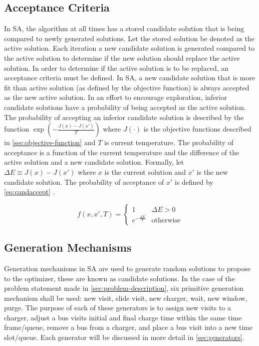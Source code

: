 \documentclass[11pt,a4paper,final]{article}
\newcommand{\Tau}{T}                        %
\begin{document}
\subsection{Acceptance Criteria}
\label{sec:acceptance}
In SA, the algorithm at all times has a stored candidate solution that is being compared to newly generated solutions.
Let the stored solution be denoted as the active solution. Each iteration a new candidate solution is generated compared
to the active solution to determine if the new solution should replace the active solution. In order to determine if the
active solution is to be replaced, an acceptance criteria must be defined. In SA, a new candidate solution that is more
fit than active solution (as defined by the objective function) is always accepted as the new active solution. In an
effort to encourage exploration, inferior candidate solutions have a probability of being accepted as the active
solution. The probability of accepting an inferior candidate solution is described by the function \(\exp(-\frac{J(x) -
J(x')}{\Tau})\) where \(J(\cdot)\) is the objective functions described in \ref{sec:objective-function} and \(\Tau\) is current
temperature. The probability of acceptance is a function of the current temperature and the difference of the active
solution and a new candidate solution. Formally, let \(\Delta E \equiv J(x) - J(x')\) where \(x\) is the current solution and \(x'\) is
the new candidate solution. The probability of acceptance of \(x'\) is defined by \ref{eq:candaccept}
\cite{keller-2019-multi-objec}.

\begin{equation}
\label{eq:candaccept}
f(x,x',T) =
\begin{cases}
  1                   & \Delta E > 0 \\
  e^{- \frac{\Delta E}{T}} & \text{otherwise}
\end{cases}
\end{equation}

\subsection{Generation Mechanisms}
\label{sec:generation-mechanisms}
Generation mechanisms in SA are used to generate random solutions to propose to the optimizer, these are known as
candidate solutions. In the case of the problem statement made in \ref{sec:problem-description}, six primitive generation
mechanism shall be used: new visit, slide visit, new charger, wait, new window, purge. The purpose of each of these
generators is to assign new visits to a charger, adjust a bus visits initial and final charge time within the same time
frame/queue, remove a bus from a charger, and place a bus visit into a new time slot/queue. Each generator will be
discussed in more detail in \ref{sec:generators}.
\end{document}
